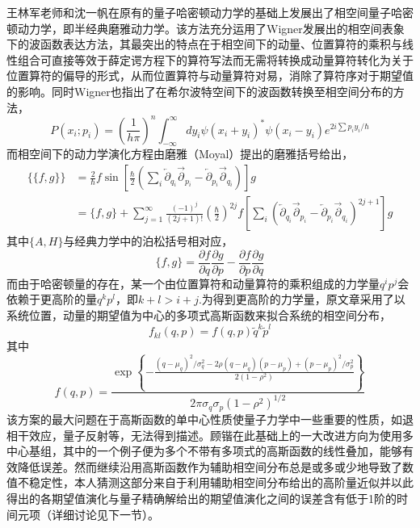 王林军老师和沈一帆在原有的量子哈密顿动力学的基础上发展出了相空间量子哈密顿动力学，即半经典磨雅动力学\cite{YifanShenPSQHD,LinjunSemiclassical}。该方法充分运用了Wigner发展出的相空间表象下的波函数表达方法，其最突出的特点在于相空间下的动量、位置算符的乘积与线性组合可直接等效于薛定谔方程下的算符写法而无需将转换成动量算符转化为关于位置算符的偏导的形式\cite{wigner1997quantum}，从而位置算符与动量算符对易，消除了算符序对于期望值的影响。同时Wigner也指出了在希尔波特空间下的波函数转换至相空间分布的方法，
\begin{equation}
	P\left(x_{i} ; p_{i}\right)=\left(\frac{1}{h \pi}\right)^{n} \int_{-\infty}^{\infty} d y_{i} \psi\left(x_{i}+y_{i}\right)^{*} \psi\left(x_{i}-y_{i}\right) e^{2 i \sum p_{i} y_{i} / \hbar}
\end{equation}
而相空间下的动力学演化方程由磨雅（Moyal）提出的磨雅括号给出，
\begin{equation}
\begin{aligned}
	 \{\{f, g\}\}&=\frac{2}{\hbar} f \sin \left[\frac{\hbar}{2}\left(\sum_{i} \overleftarrow{\partial}_{q_{i}} \overrightarrow{\partial}_{p_{i}}-\overleftarrow{\partial}_{p_{i}} \overrightarrow{\partial}_{q_{i}}\right)\right] g  \\
	 &=\{f, g\}+\sum_{j=1}^{\infty} \frac{(-1)^{j}}{(2 j+1) !}\left(\frac{\hbar}{2}\right)^{2 j} f\left[\sum_i\left(\overleftarrow{\partial}_{q_{i}} \overrightarrow{\partial}_{p_{i}}-\overleftarrow{\partial}_{p_{i}} \overrightarrow{\partial}_{q_{i}}\right)^{2 j+1}\right] g
\end{aligned}
\label{Moyal_review}
\end{equation}
其中$\{A, H\}$与经典力学中的泊松括号相对应，
\begin{equation}
	\{f, g\}=\frac{\partial f}{\partial q} \frac{\partial g}{\partial p}-\frac{\partial f}{\partial p} \frac{\partial g}{\partial q}
\end{equation}
而由于哈密顿量的存在，某一个由位置算符和动量算符的乘积组成的力学量$q^i p^j$会依赖于更高阶的量$q^k p^l$，即$k+l > i+j$.为得到更高阶的力学量，原文章采用了以系统位置，动量的期望值为中心的多项式高斯函数来拟合系统的相空间分布，
\begin{equation}
f_{k l}(q, p)=f(q, p) \tilde{q}^{k} \tilde{p}^{l}
\end{equation}
其中
\begin{equation}
	f(q, p)=\frac{\exp \left\{-\frac{\left(q-\mu_{q}\right)^{2} / \sigma_{q}^{2}-2 \rho\left(q-\mu_{q}\right)\left(p-\mu_{p}\right)+\left(p-\mu_{p}\right)^{2} / \sigma_{p}^{2}}{2\left(1-\rho^{2}\right)}\right\}}{2 \pi \sigma_{q} \sigma_{p}\left(1-\rho^{2}\right)^{1 / 2}}
\end{equation}
该方案的最大问题在于高斯函数的单中心性质使量子力学中一些重要的性质，如退相干效应，量子反射等，无法得到描述\cite{YifanShenPSQHD}。顾锴在此基础上的一大改进方向为使用多中心基组，其中的一个例子便为多个不带有多项式的高斯函数的线性叠加，能够有效降低误差\cite{kaiguPSQHD}。然而继续沿用高斯函数作为辅助相空间分布总是或多或少地导致了数值不稳定性，本人猜测这部分来自于利用辅助相空间分布给出的高阶量近似并以此得出的各期望值演化与量子精确解给出的期望值演化之间的误差含有低于1阶的时间元项（详细讨论见下一节）。

